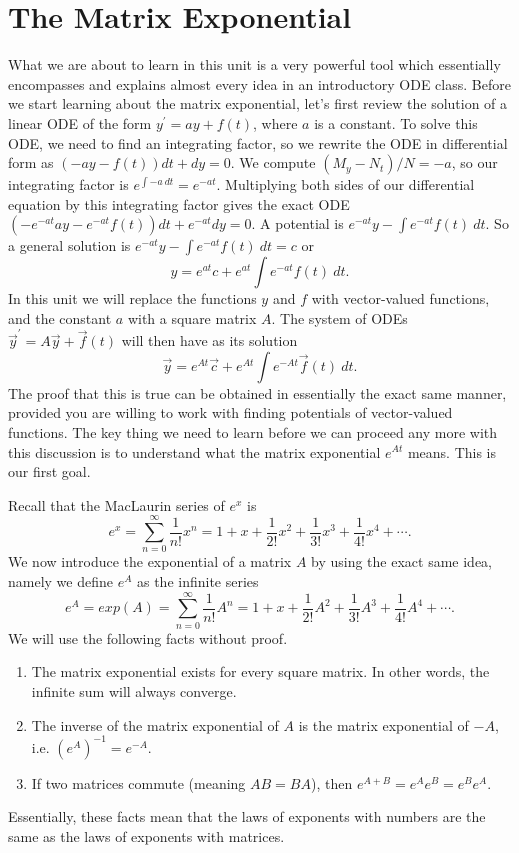 \section{The Matrix Exponential}
What we are about to learn in this unit is a very powerful tool which essentially encompasses and explains almost every idea in an introductory ODE class.  Before we start learning about the matrix exponential, let's first review the solution of a linear ODE of the form $y^\prime =a y+f(t)$, where $a$ is a constant.  To solve this ODE, we need to find an integrating factor, so we rewrite the ODE in differential form as $(-ay-f(t))dt + dy=0$.  We compute $(M_y-N_t)/N = -a$, so our integrating factor is $e^{\int -a\ dt} = e^{-at}$.  Multiplying both sides of our differential equation by this integrating factor gives the exact ODE $(-e^{-at}ay-e^{-at}f(t))dt+e^{-at}dy=0$.  A potential is $e^{-at}y-\int e^{-at}f(t)\ dt$.  So a general solution is $e^{-at}y-\int e^{-at}f(t)\ dt=c$ or $$y=e^{at}c+e^{at}\int e^{-at}f(t)\ dt.$$ 
In this unit we will replace the functions $y$ and $f$ with vector-valued functions, and the constant $a$ with a square matrix $A$. The system of ODEs $\vec y^\prime =A \vec y+\vec f(t)$ will then have as its solution 
$$\vec y=e^{At}\vec c+e^{At}\int e^{-At}\vec f(t)\ dt.$$ 
The proof that this is true can be obtained in essentially the exact same manner, provided you are willing to work with finding potentials of vector-valued functions. The key thing we need to learn before we can proceed any more with this discussion is to understand what the matrix exponential $e^{At}$ means. This is our first goal.

Recall that the MacLaurin series of $e^x$ is
$$e^x = \sum_{n=0}^\infty \frac{1}{n!}x^n = 1+x+\frac{1}{2!}x^2+\frac{1}{3!}x^3+\frac{1}{4!}x^4+\cdots.$$
We now introduce the exponential of a matrix $A$ by using the exact same idea, namely we define $e^A$ as the infinite series
$$e^A = exp(A) = \sum_{n=0}^\infty \frac{1}{n!}A^n = 1+x+\frac{1}{2!}A^2+\frac{1}{3!}A^3+\frac{1}{4!}A^4+\cdots.$$
We will use the following facts without proof.
\begin{enumerate}
	\item The matrix exponential exists for every square matrix. In other words, the infinite sum will always converge.
	\item The inverse of the matrix exponential of $A$ is the matrix exponential of $-A$, i.e. $(e^A)^{-1}=e^{-A}$. 
	\item If two matrices commute (meaning $AB=BA$), then  $e^{A+B}=e^Ae^B = e^Be^A$.
\end{enumerate}
Essentially, these facts mean that the laws of exponents with numbers are the same as the laws of exponents with matrices.


